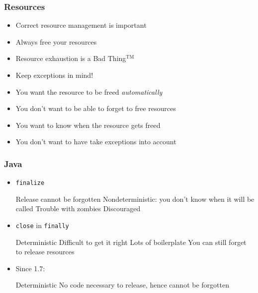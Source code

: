 \documentclass{../ucll-slides}
\begin{document}
\begin{frame}
  \frametitle{Resources}
  \begin{itemize}
    \item Correct resource management is important
    \item Always free your resources
    \item Resource exhaustion is a Bad Thing$^{\textrm{TM}}$
    \item Keep exceptions in mind!
  \end{itemize}
  \vskip5mm
  \begin{itemize}
    \item You want the resource to be freed \emph{automatically}
    \item You don't want to be able to forget to free resources
    \item You want to know when the resource gets freed
    \item You don't want to have take exceptions into account
  \end{itemize}
\end{frame}

\begin{frame}
  \frametitle{Java}
  \begin{itemize}
    \item {\tt finalize}
          \begin{procontralist}
            \pro Release cannot be forgotten
            \con Nondeterministic: you don't know when it will be called
            \con Trouble with zombies
            \con Discouraged
          \end{procontralist}
    \item {\tt close} in {\tt finally}
          \begin{procontralist}
            \pro Deterministic
            \con Difficult to get it right
            \con Lots of boilerplate
            \con You can still forget to release resources
          \end{procontralist}
    \item Since 1.7: 
          \begin{procontralist}
            \pro Deterministic
            \pro No code necessary to release, hence cannot be forgotten
          \end{procontralist}
  \end{itemize}
\end{frame}
\end{document}
